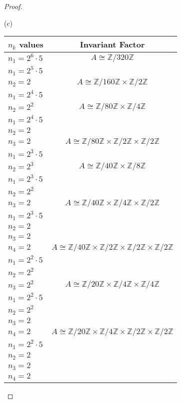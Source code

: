 \documentclass[10pt]{article}
\newcommand{\Z}{\mathbb{Z}}
\begin{document}
\begin{itemize}
\begin{proof}
\begin{item} (c)

\begin{center}
  \begin{tabular}{ l  c }
    $n_k$ values & Invariant Factor \\ \hline
    $n_1=2^6 \cdot 5$ & $A\cong \Z / 320\Z$ \\ \hline
	\hline    
	$n_1=2^5 \cdot 5$ &  \\ \hline
	$n_2=2$ & $A\cong \Z / 160\Z \times \Z / 2\Z$ \\ \hline
    \hline
	$n_1=2^4 \cdot 5$ & \\ \hline
	$n_2=2^2$ & $A\cong \Z / 80\Z \times \Z / 4\Z$ \\ \hline
	\hline
	$n_1=2^4 \cdot 5$ & \\ \hline
	$n_2=2$ &  \\ \hline
	$n_3=2$ & $A\cong \Z / 80\Z \times \Z / 2\Z \times \Z / 2\Z$ \\ \hline
	\hline
	$n_1=2^3 \cdot 5$ & \\ \hline
	$n_2=2^3$ & $A\cong \Z / 40\Z \times \Z / 8\Z$ \\ \hline
	\hline
	$n_1=2^3 \cdot 5$ &  \\ \hline
	$n_2=2^2$ & \\ \hline
	$n_3=2$ & $A\cong \Z / 40\Z \times \Z / 4\Z \times \Z / 2\Z$ \\ \hline
    \hline
	$n_1=2^3 \cdot 5$ &  \\ \hline
	$n_2=2$ & \\ \hline
	$n_3=2$ & \\ \hline
	$n_4=2$ & $A\cong \Z / 40\Z \times \Z / 2\Z \times \Z / 2\Z \times \Z / 2\Z$ \\ \hline
	\hline
	$n_1=2^2 \cdot 5$ & \\ \hline
	$n_2=2^2$ & \\ \hline
	$n_3=2^2$ & $A\cong \Z / 20\Z \times \Z / 4\Z \times \Z / 4\Z$ \\ \hline
	\hline
	$n_1=2^2 \cdot 5$ & \\ \hline
	$n_2=2^2$ &  \\ \hline
	$n_3=2$ & \\ \hline
	$n_4=2$ & $A\cong \Z / 20\Z \times \Z / 4\Z \times \Z / 2\Z \times \Z / 2\Z$ \\ \hline
	\hline
	$n_1=2^2 \cdot 5$ & \\ \hline
	$n_2=2$ & \\ \hline
	$n_3=2$ & \\ \hline
	$n_4=2$ & \\ \hline

\end{tabular}
\end{center}
\end{item}
\end{proof}
\end{itemize}
\end{document}
